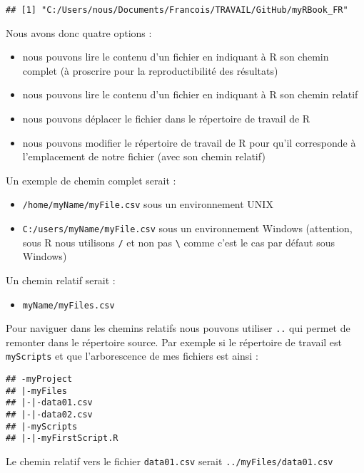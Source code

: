 \documentclass[]{book}
\providecommand{\tightlist}{%
  \setlength{\itemsep}{0pt}\setlength{\parskip}{0pt}}
\theoremstyle{definition}
\theoremstyle{definition}
\theoremstyle{definition}
\theoremstyle{remark}
\begin{document}
\begin{verbatim}
## [1] "C:/Users/nous/Documents/Francois/TRAVAIL/GitHub/myRBook_FR"
\end{verbatim}

Nous avons donc quatre options :

\begin{itemize}
\tightlist
\item
  nous pouvons lire le contenu d'un fichier en indiquant à R son chemin
  complet (à proscrire pour la reproductibilité des résultats)
\item
  nous pouvons lire le contenu d'un fichier en indiquant à R son chemin
  relatif
\item
  nous pouvons déplacer le fichier dans le répertoire de travail de R
\item
  nous pouvons modifier le répertoire de travail de R pour qu'il
  corresponde à l'emplacement de notre fichier (avec son chemin relatif)
\end{itemize}

Un exemple de chemin complet serait :

\begin{itemize}
\tightlist
\item
  \texttt{/home/myName/myFile.csv} sous un environnement UNIX
\item
  \texttt{C:/users/myName/myFile.csv} sous un environnement Windows
  (attention, sous R nous utilisons \texttt{/} et non pas
  \texttt{\textbackslash{}} comme c'est le cas par défaut sous Windows)
\end{itemize}

Un chemin relatif serait :

\begin{itemize}
\tightlist
\item
  \texttt{myName/myFiles.csv}
\end{itemize}

Pour naviguer dans les chemins relatifs nous pouvons utiliser
\texttt{..} qui permet de remonter dans le répertoire source. Par
exemple si le répertoire de travail est \texttt{myScripts} et que
l'arborescence de mes fichiers est ainsi :

\begin{verbatim}
## -myProject
## |-myFiles
## |-|-data01.csv
## |-|-data02.csv
## |-myScripts
## |-|-myFirstScript.R
\end{verbatim}

Le chemin relatif vers le fichier \texttt{data01.csv} serait
\texttt{../myFiles/data01.csv}
\end{document}
